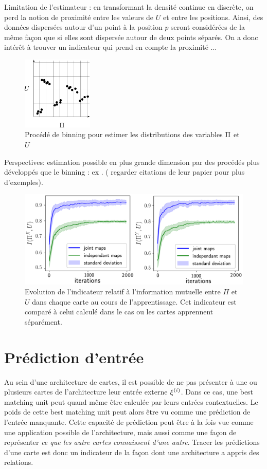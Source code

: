Limitation de l'estimateur : en transformant la densité continue en discrète, on perd la notion de proximité entre les valeurs de $U$ et entre les positions. Ainsi, des données dispersées autour d'un point à la position $p$ seront considérées de la même façon que si elles sont dispersée autour de deux points séparés. On a donc intérêt à trouver un indicateur qui prend en compte la proximité ...



\begin{figure}
\centering
\includegraphics[width=0.3\textwidth]{boxes}
\caption{Procédé de binning pour estimer les distributions des variables $\Pi$ et $U$}
\label{fig:binning} 
\end{figure}

Perspectives: estimation possible en plus grande dimension par des procédés plus développés que le binning : ex \cite{Belghazi2018MutualIN}. ( regarder citations de leur papier pour plus d'exemples). 


\begin{figure}
\centering
\includegraphics[width=\textwidth]{mutual_info_evol.pdf}
\caption{Evolution de l'indicateur relatif à l'information mutuelle entre $\Pi$ et $U$ dans chaque carte au cours de l'apprentissage. Cet indicateur est comparé à celui calculé dans le cas ou les cartes apprennent séparément.}
\label{fig:im} 
\end{figure}


\section{Prédiction d'entrée}

Au sein d'une architecture de cartes, il est possible de ne pas présenter à une ou plusieurs cartes de l'architecture leur entrée externe $\xi^{({i})}$. Dans ce cas, une best matching unit peut quand même être calculée par leurs entrées contextuelles. Le poids de cette best matching unit peut alors être vu comme une prédiction de l'entrée manquante. Cette capacité de prédiction peut être à la fois vue comme une application possible de l'architecture, mais aussi comme une façon de représenter \emph{ce que les autre cartes connaissent d'une autre}. Tracer les prédictions d'une carte est donc un indicateur de la façon dont une architecture a appris des relations. 